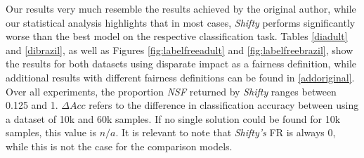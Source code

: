 
Our results very much resemble the results achieved by the original author, while our statistical analysis highlights that in most cases, \textit{Shifty} performs significantly worse than the best model on the respective classification task. Tables \ref{diadult} and \ref{dibrazil}, as well as Figures \ref{fig:labelfreeadult} and \ref{fig:labelfreebrazil}, show the results for both datasets using disparate impact as a fairness definition, while additional results with different fairness definitions can be found in \ref{addoriginal}. Over all experiments, the proportion \textit{NSF} returned by \textit{Shifty} ranges between 0.125 and 1. $\Delta Acc$ refers to  the difference in classification accuracy between using a dataset of 10k and 60k samples. If no single solution could be found for 10k samples, this value is $n/a$. It is relevant to note that \textit{Shifty's} FR is always 0, while this is not the case for the comparison models.

